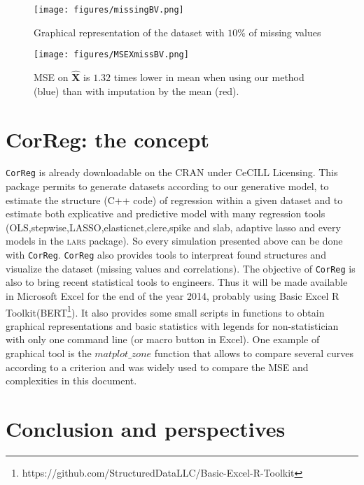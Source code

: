 \documentclass[12pt,a4paper]{report}
\begin{document}
	\begin{figure}[h!]
		\centering
		\texttt{[image: figures/missingBV.png]} 
		\caption{Graphical representation of the dataset with $10\%$ of missing values}\label{missingBV}
	\end{figure}
	\begin{figure}[h!]
		\centering
		\texttt{[image: figures/MSEXmissBV.png]} 
		\caption{MSE on $\hat{\boldsymbol{X}}$ is $1.32$ times lower in mean when using our method (blue) than with imputation by the mean (red).}\label{MSEXmissBV}
	\end{figure}


\chapter{CorReg: the concept}	
	
		{\tt CorReg} is already downloadable on the CRAN under CeCILL Licensing. This package permits to generate datasets according to our generative model, to estimate the structure (C++ code) of regression within a given dataset and to estimate both explicative and predictive model with many regression tools (OLS,stepwise,LASSO,elasticnet,clere,spike and slab, adaptive lasso and every models in the \textsc{lars} package). So every simulation presented above can be done with {\tt CorReg}.
	{\tt CorReg} also provides tools to interpreat found structures and visualize the dataset (missing values and correlations). %
	The objective of {\tt CorReg} is also to bring recent statistical tools to engineers. Thus it will be made  available in Microsoft Excel for the end of the year 2014, probably using Basic Excel R Toolkit(BERT\footnote{https://github.com/StructuredDataLLC/Basic-Excel-R-Toolkit}). It also provides some small scripts in functions to obtain graphical representations and basic statistics with legends for non-statistician with only one command line (or macro button in Excel). One example of graphical tool is the $matplot\_zone$ function that allows to compare several curves according to a criterion and was widely used to compare the MSE and complexities in this document.
	
\chapter{Conclusion and perspectives}
\end{document}
